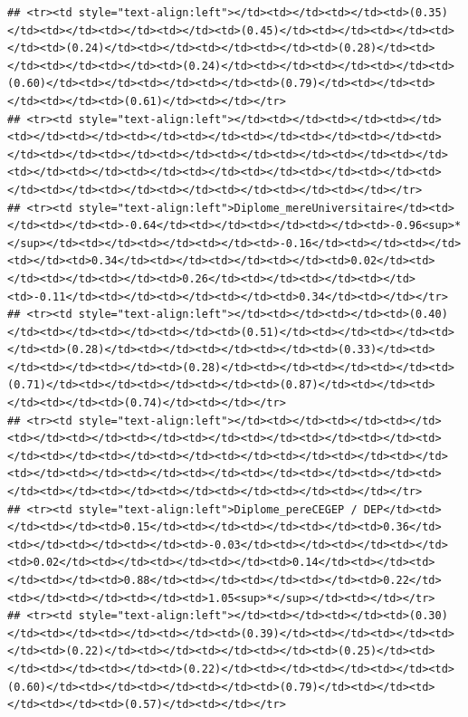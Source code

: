 \documentclass[
]{article}
\begin{document}
\begin{verbatim}
## <tr><td style="text-align:left"></td><td></td><td></td><td>(0.35)</td><td></td><td></td><td></td><td>(0.45)</td><td></td><td></td><td></td><td>(0.24)</td><td></td><td></td><td></td><td>(0.28)</td><td></td><td></td><td></td><td>(0.24)</td><td></td><td></td><td></td><td>(0.60)</td><td></td><td></td><td></td><td>(0.79)</td><td></td><td></td><td></td><td>(0.61)</td><td></td></tr>
## <tr><td style="text-align:left"></td><td></td><td></td><td></td><td></td><td></td><td></td><td></td><td></td><td></td><td></td><td></td><td></td><td></td><td></td><td></td><td></td><td></td><td></td><td></td><td></td><td></td><td></td><td></td><td></td><td></td><td></td><td></td><td></td><td></td><td></td><td></td><td></td></tr>
## <tr><td style="text-align:left">Diplome_mereUniversitaire</td><td></td><td></td><td>-0.64</td><td></td><td></td><td></td><td>-0.96<sup>*</sup></td><td></td><td></td><td></td><td>-0.16</td><td></td><td></td><td></td><td>0.34</td><td></td><td></td><td></td><td>0.02</td><td></td><td></td><td></td><td>0.26</td><td></td><td></td><td></td><td>-0.11</td><td></td><td></td><td></td><td>0.34</td><td></td></tr>
## <tr><td style="text-align:left"></td><td></td><td></td><td>(0.40)</td><td></td><td></td><td></td><td>(0.51)</td><td></td><td></td><td></td><td>(0.28)</td><td></td><td></td><td></td><td>(0.33)</td><td></td><td></td><td></td><td>(0.28)</td><td></td><td></td><td></td><td>(0.71)</td><td></td><td></td><td></td><td>(0.87)</td><td></td><td></td><td></td><td>(0.74)</td><td></td></tr>
## <tr><td style="text-align:left"></td><td></td><td></td><td></td><td></td><td></td><td></td><td></td><td></td><td></td><td></td><td></td><td></td><td></td><td></td><td></td><td></td><td></td><td></td><td></td><td></td><td></td><td></td><td></td><td></td><td></td><td></td><td></td><td></td><td></td><td></td><td></td><td></td></tr>
## <tr><td style="text-align:left">Diplome_pereCEGEP / DEP</td><td></td><td></td><td>0.15</td><td></td><td></td><td></td><td>0.36</td><td></td><td></td><td></td><td>-0.03</td><td></td><td></td><td></td><td>0.02</td><td></td><td></td><td></td><td>0.14</td><td></td><td></td><td></td><td>0.88</td><td></td><td></td><td></td><td>0.22</td><td></td><td></td><td></td><td>1.05<sup>*</sup></td><td></td></tr>
## <tr><td style="text-align:left"></td><td></td><td></td><td>(0.30)</td><td></td><td></td><td></td><td>(0.39)</td><td></td><td></td><td></td><td>(0.22)</td><td></td><td></td><td></td><td>(0.25)</td><td></td><td></td><td></td><td>(0.22)</td><td></td><td></td><td></td><td>(0.60)</td><td></td><td></td><td></td><td>(0.79)</td><td></td><td></td><td></td><td>(0.57)</td><td></td></tr>

\end{verbatim}
\end{document}
